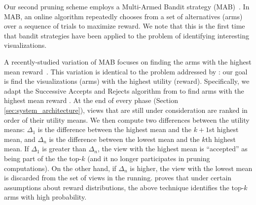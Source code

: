 \label{sec:multi_armed_bandit}
Our second pruning scheme employs a Multi-Armed Bandit strategy (MAB)~.
In MAB, an online algorithm repeatedly chooses from a set of alternatives (arms)
over a sequence of trials to maximize reward. 
We note that this is the first time that bandit strategies have been
applied to the problem of identifying interesting visualizations.

A recently-studied variation of MAB focuses on finding the arms with the highest
mean reward~\cite{BubeckWV13, audibert2010best}.
This variation is identical to the problem addressed by \SeeDB: our goal is 
find the visualizations (arms) with the  highest utility (reward).
Specifically, we adapt the Successive Accepts and Rejects algorithm from \cite{BubeckWV13} 
to find arms with the highest mean reward
. 
At the end of every phase (Section \ref{sec:system_architecture}), 
views that are still under consideration 
are ranked in order of their utility means. 
We then compute two  differences between the utility means: $\Delta_1$
is the difference between the highest mean and the $k+1$st highest mean, and
$\Delta_n$ is the difference between the lowest mean and the $k$th highest mean.
If $\Delta_1$ is greater than $\Delta_n$, the view with the highest mean is
``accepted'' as being part of the the top-$k$ (and it no longer participates
in pruning computations).
On the other hand, if $\Delta_n$ is higher, the view with the lowest mean is discarded
from the set of views in the running.
\cite{BubeckWV13} proves that under certain assumptions about reward distributions,
the above technique identifies the top-$k$ arms with high probability.


